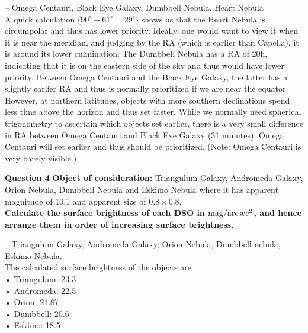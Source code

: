 \documentclass[a4paper,12pt]{extarticle}
\begin{document}
\begin{sol}
    -- Omega Centauri, Black Eye Galaxy, Dumbbell Nebula, Heart Nebula\\
    
    A quick calculation ($90^\circ-61^\circ= 29^\circ$) shows us that the Heart Nebula is circumpolar and thus has lower priority. Ideally, one would want to view it when it is near the meridian, and judging by the RA (which is earlier than Capella), it is around its lower culmination. The Dumbbell Nebula has a RA of 20h, indicating that it is on the eastern side of the sky and thus would have lower priority. Between Omega Centauri and the Black Eye Galaxy, the latter has a slightly earlier RA and thus is normally prioritized if we are near the equator. However, at northern latitudes, objects with more southern declinations spend less time above the horizon and thus set faster. While we normally need spherical trigonometry to ascertain which objects set earlier, there is a very small difference in RA between Omega Centauri and Black Eye Galaxy (31 minutes). Omega Centauri will set earlier and thus should be prioritized. (Note: Omega Centauri is very barely visible.)
\end{sol}
 
 
\textsf{\textbf{Question 4}} \textbf{Object of consideration:} Triangulum Galaxy, Andromeda Galaxy, Orion Nebula, Dumbbell Nebula and Eskimo Nebula where it has apparent magnitude of 10.1 and apparent size of $0.8\times 0.8$. \\ 

\textbf{Calculate the surface brightness of each DSO in $\rm mag/arcsec^2$, and hence arrange them in order of increasing surface brightness.} 

\begin{sol}
-- Triangulum Galaxy, Andromeda Galaxy, Orion Nebula, Dumbbell nebula, Eskimo
Nebula.\\
The calculated surface brightness of the objects are\\
• Triangulum: 23.3\\
• Andromeda: 22.5\\
• Orion: 21.87\\
• Dumbbell: 20.6\\
• Eskimo: 18.5	
\end{sol}


\vspace{0.5 cm}
\end{document}
